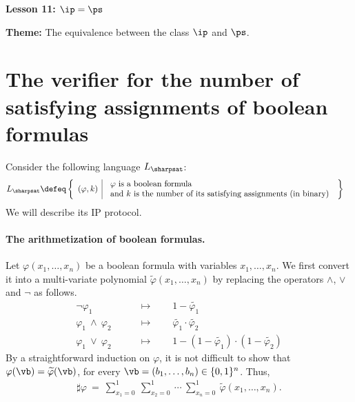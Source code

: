 \documentclass[11pt, a4paper]{article}
\renewcommand{\lesson}{11}
\renewcommand{\lessontitle}{$\ip=\ps$}
\renewcommand{\fulltitle}{Lesson \lesson: \lessontitle}
\begin{document}
\date{}



\begin{center}
{\Large {\bf \fulltitle}}
\end{center}
\vspace{0.5cm}

\noindent
{\bf Theme:} The equivalence between the class $\ip$ and $\ps$.


\section{The verifier for the number of satisfying assignments of boolean formulas}

Consider the following language $L_{\sharpsat}$:
\begin{align*}
L_{\sharpsat} & \defeq  
\left\{
\begin{array}{l|l}
(\varphi,k) &
\begin{array}{l}
\text{$\varphi$ is a boolean formula}\\
\text{and $k$ is the number of its satisfying assignments (in binary)}
\end{array}
\end{array}
\right\}
\end{align*}
We will describe its IP protocol.

\paragraph*{The arithmetization of boolean formulas.}
Let $\varphi(x_1,\ldots,x_n)$ be a boolean formula with variables $x_1,\ldots,x_n$.
We first convert it into a multi-variate polynomial $\widetilde{\varphi}(x_1,\ldots,x_n)$
by replacing the operators $\wedge$, $\vee$ and $\neg$ as follows.
\begin{align*}
\neg \varphi_1 \qquad& \mapsto\qquad 1-\widetilde{\varphi_1}
\\
\varphi_1 \ \wedge \ \varphi_2 \qquad& \mapsto\qquad \widetilde{\varphi_1} \cdot \widetilde{\varphi_2}
\\
\varphi_1 \ \vee \ \varphi_2 \qquad& \mapsto\qquad 1- (1-\widetilde{\varphi_1}) \cdot(1- \widetilde{\varphi_2})
\end{align*}
By a straightforward induction on $\varphi$, it is not difficult to show that
$\varphi(\vb) =\widetilde{\varphi}(\vb)$, for every $\vb=(b_1,\ldots,b_n)\in \{0,1\}^n$.
Thus,
\begin{align*}
\sharp\varphi \ = \
\sum_{x_1=0}^1\ \sum_{x_2=0}^1\ \cdots\ \sum_{x_n=0}^1 \ \widetilde{\varphi}(x_1,\ldots,x_n).
\end{align*}
\end{document}
